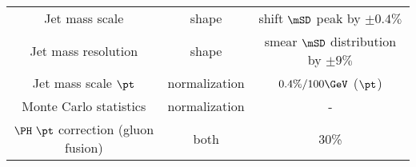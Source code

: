 \begin{table}[!h]
\begin{center}
{\begin{tabular}{ccc}
Jet mass scale              & shape & shift $\mSD$ peak by $\pm0.4\%$ \\
Jet mass resolution              & shape & smear $\mSD$ distribution by $\pm9\%$ \\
Jet mass scale $\pt$              & normalization & $0.4\%/100\GeV$ ($\pt$) \\
Monte Carlo statistics        & normalization & - \\
$\PH~\pt$ correction (gluon fusion)   & both & 30\%\\
\hline\hline
\end{tabular}
}
\end{center}
\end{table}

